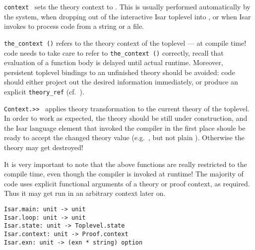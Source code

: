 \begin{isabellebody}
\begin{isamarkuptext}
  \begin{description}

  \item \verb|context|~ sets the {\ML} theory context to
  .  This is usually performed automatically by the system,
  when dropping out of the interactive Isar toplevel into {\ML}, or
  when Isar invokes {\ML} to process code from a string or a file.

  \item \verb|the_context ()| refers to the theory context of the
  {\ML} toplevel --- at compile time!  {\ML} code needs to take care
  to refer to \verb|the_context ()| correctly, recall that evaluation
  of a function body is delayed until actual runtime.  Moreover,
  persistent {\ML} toplevel bindings to an unfinished theory should be
  avoided: code should either project out the desired information
  immediately, or produce an explicit \verb|theory_ref| (cf.\
  ).

  \item \verb|Context.>>|~ applies theory transformation
  \isa{f} to the current theory of the {\ML} toplevel.  In order to
  work as expected, the theory should be still under construction, and
  the Isar language element that invoked the {\ML} compiler in the
  first place shoule be ready to accept the changed theory value
  (e.g.\ \isakeyword{ML-setup}, but not plain \isakeyword{ML}).
  Otherwise the theory may get destroyed!

  \end{description}

  It is very important to note that the above functions are really
  restricted to the compile time, even though the {\ML} compiler is
  invoked at runtime!  The majority of {\ML} code uses explicit
  functional arguments of a theory or proof context, as required.
  Thus it may get run in an arbitrary context later on.

  \bigskip

  \begin{mldecls}
  \verb|Isar.main: unit -> unit| \\
  \verb|Isar.loop: unit -> unit| \\
  \verb|Isar.state: unit -> Toplevel.state| \\
  \indexml{Isar.context}\verb|Isar.context: unit -> Proof.context| \\
  \indexml{Isar.exn}\verb|Isar.exn: unit -> (exn * string) option| \\
  \end{mldecls}


\end{isamarkuptext}
\end{isabellebody}
